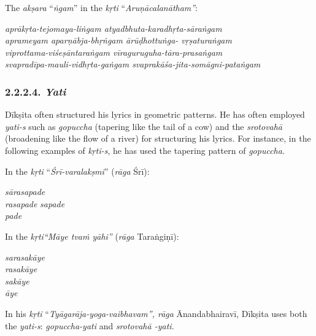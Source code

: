 The \textit{akṣara} “\textit{ṅgam}” in the \textit{kṛti} “\textit{Aruṇācalanātham”}:

\begin{myquote}
\textit{aprākṛta-tejomaya-liṅgam atyadbhuta-karadhṛta-sāraṅgam}\\ \textit{aprameyam aparṇābja-bhṛṅgam ārūḍhottuṅga- vṛṣaturaṅgam}\\ \textit{viprottama-viśeṣāntaraṅgam vīraguruguha-tāra-prasaṅgam}\\ \textit{svapradīpa-mauli-vidhṛta-gaṅgam svaprakāśa-jita-somāgni-pataṅgam}
\end{myquote}



\subsubsection*{2.2.2.4. \textit{Yati}}

Dīkṣita often structured his lyrics in geometric patterns. He has often employed \textit{yati-s} such as \textit{gopuccha} (tapering like the tail of a cow) and the \textit{srotovahā} (broadening like the flow of a river) for structuring his lyrics. For instance, in the following examples of \textit{kṛti-s}, he has used the tapering pattern of \textit{gopuccha}.

In the \textit{kṛti} “\textit{Śrī-varalakṣmi}” (\textit{rāga} Śrī):

\begin{myquote}
\textit{sārasapade}\\ \textit{rasapade} \textit{sapade}\\ \textit{pade}
\end{myquote}

In the \textit{kṛti“Māye tvaṁ yāhi”} (\textit{rāga} Taraṅgiṇī):

\begin{myquote}
\textit{sarasakāye}\\ \textit{rasakāye}\\ \textit{sakāye}\\ \textit{āye}
\end{myquote}

In his \textit{kṛti} “\textit{Tyāgarāja-yoga-vaibhavam”, rāga} Ānandabhairavī, Dīkṣita uses both the \textit{yati-s}: \textit{gopuccha-yati} and \textit{srotovahā -yati.}

